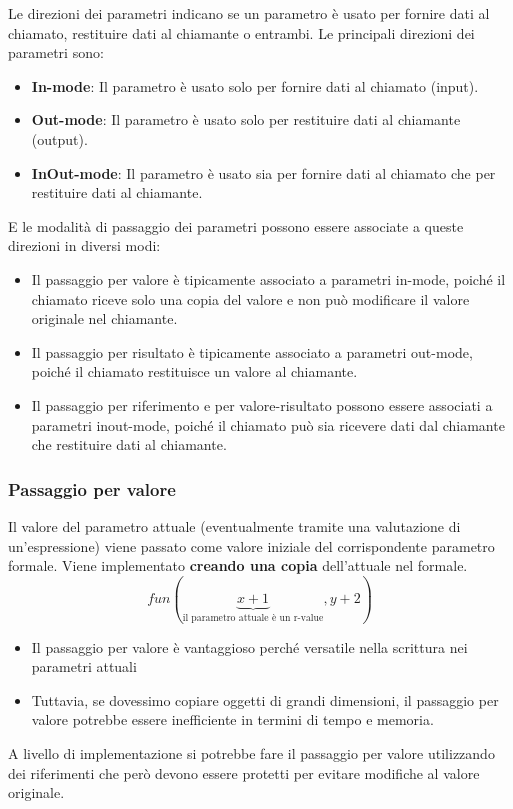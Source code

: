 \documentclass[a4paper]{article}
\begin{document}
Le direzioni dei parametri indicano se un parametro è usato per fornire dati al chiamato, 
restituire dati al chiamante o entrambi. Le principali direzioni dei parametri sono:
\begin{itemize}
  \item \textbf{In-mode}: Il parametro è usato solo per fornire dati al chiamato (input).
  \item \textbf{Out-mode}: Il parametro è usato solo per restituire dati al chiamante (output).
  \item \textbf{InOut-mode}: Il parametro è usato sia per fornire dati al chiamato che per restituire dati al chiamante.
\end{itemize}
E le modalità di passaggio dei parametri possono essere associate a queste direzioni in diversi modi:
\begin{itemize}
  \item Il passaggio per valore è tipicamente associato a parametri in-mode, poiché il chiamato 
  riceve solo una copia del valore e non può modificare il valore originale nel chiamante.
  \item Il passaggio per risultato è tipicamente associato a parametri out-mode, poiché il chiamato restituisce un valore al chiamante.
  \item Il passaggio per riferimento e per valore-risultato possono essere associati a parametri inout-mode, 
  poiché il chiamato può sia ricevere dati dal chiamante che restituire dati al chiamante.
\end{itemize}

\subsubsection{Passaggio per valore}

\dfn{}
{
  Il valore del parametro attuale (eventualmente tramite una valutazione di un'espressione)
  viene passato come valore iniziale del corrispondente parametro formale.
  Viene implementato \textbf{creando una copia} dell'attuale nel formale.
  \[
    fun (\underbrace{x+1}_{\text{il parametro attuale è un r-value}}, y+2)
  \]
}
\noindent
\begin{itemize}
  \item Il passaggio per valore è vantaggioso perché versatile nella scrittura nei parametri attuali
  \item Tuttavia, se dovessimo copiare oggetti di grandi dimensioni, il passaggio per valore potrebbe 
  essere inefficiente in termini di tempo e memoria.
\end{itemize}
A livello di implementazione si potrebbe fare il passaggio per valore utilizzando dei riferimenti
che però devono essere protetti per evitare modifiche al valore originale.
\end{document}
